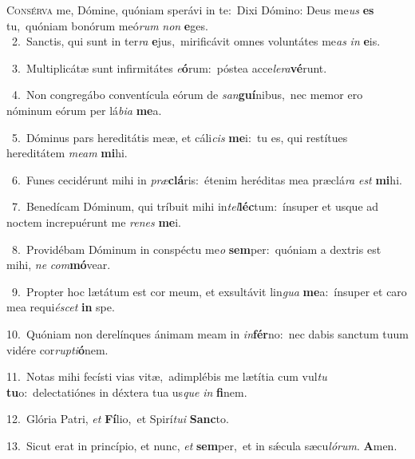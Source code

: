 \lettrine{\initial\textcolor{\initialcolor}{C}}{onsérva} me, Dómine, quóniam sperávi in te:~\dagger Dixi Dómino: Deus me\textit{us} \textbf{es} tu,~\star quóniam bonórum meó\textit{rum} \textit{non} \textbf{e}\-ges.\\
{\numbfont\textcolor{\numbcolor}{~2.}}~Sanctis, qui sunt in ter\textit{ra} \textbf{e}\-jus,~\star mirificávit omnes voluntátes me\textit{as} \textit{in} \textbf{e}\-is.\par
{\numbfont\textcolor{\numbcolor}{~3.}}~Multiplicátæ sunt infirmitátes \textit{e}\-\textbf{ó}rum:~\star póstea acce\-\textit{le}\-\textit{ra}\textbf{vé}runt.\par
{\numbfont\textcolor{\numbcolor}{~4.}}~Non congregábo conventícula eórum de \textit{san}\-\textbf{guí}nibus,~\star nec memor ero nóminum eórum per lá\-\textit{bi}\-\textit{a} \textbf{me}\-a.\par
{\numbfont\textcolor{\numbcolor}{~5.}}~Dóminus pars hereditátis meæ, et cáli\textit{cis} \textbf{me}\-i:~\star tu es, qui restítues hereditátem \textit{me}\-\textit{am} \textbf{mi}\-hi.\par
{\numbfont\textcolor{\numbcolor}{~6.}}~Funes cecidérunt mihi in \textit{præ}\-\textbf{clá}ris:~\star étenim heréditas mea præclá\textit{ra} \textit{est} \textbf{mi}\-hi.\par
{\numbfont\textcolor{\numbcolor}{~7.}}~Benedícam Dóminum, qui tríbuit mihi in\-\textit{tel}\-\textbf{léc}tum:~\star ínsuper et usque ad noctem increpuérunt me \textit{re}\-\textit{nes} \textbf{me}\-i.\par
{\numbfont\textcolor{\numbcolor}{~8.}}~Providébam Dóminum in conspéctu me\textit{o} \textbf{sem}\-per:~\star quóniam a dextris est mihi, \textit{ne} \textit{com}\-\textbf{mó}vear.\par
{\numbfont\textcolor{\numbcolor}{~9.}}~Propter hoc lætátum est cor meum, et exsultávit lin\textit{gua} \textbf{me}\-a:~\star ínsuper et caro mea requi\-\textit{é}\-\textit{scet} \textbf{in} spe.\par
{\numbfont\textcolor{\numbcolor}{10.}}~Quóniam non derelínques ánimam meam in \textit{in}\-\textbf{fér}no:~\star nec dabis sanctum tuum vidére cor\-\textit{rup}\-\textit{ti}\textbf{ó}nem.\par
{\numbfont\textcolor{\numbcolor}{11.}}~Notas mihi fecísti vias vitæ,~\dagger adimplébis me lætítia cum vul\textit{tu} \textbf{tu}\-o:~\star delectatiónes in déxtera tua us\textit{que} \textit{in} \textbf{fi}\-nem.\par
{\numbfont\textcolor{\numbcolor}{12.}}~Glória Patri, \textit{et} \textbf{Fí}\-lio,~\star et Spirí\-\textit{tu}\-\textit{i} \textbf{Sanc}\-to.\par
{\numbfont\textcolor{\numbcolor}{13.}}~Sicut erat in princípio, et nunc, \textit{et} \textbf{sem}\-per,~\star et in sǽcula sæcu\-\textit{ló}\-\textit{rum}. \textbf{A}\-men.\par
